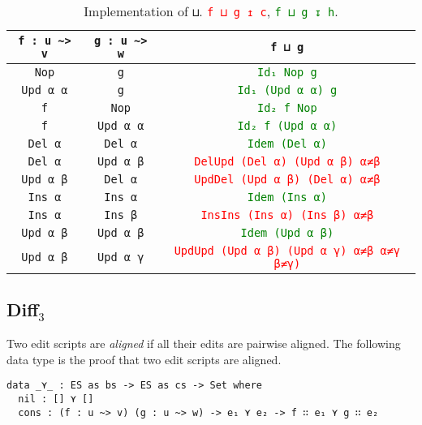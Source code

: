 \documentclass[../Thesis.tex]{subfiles}
\begin{document}
	\begin{table}[h]
	\centering
	\begin{tabular}{| c | c | c |}
	\hline
	\texttt{f : u \textasciitilde> v} & \texttt{g : u \textasciitilde> w} &  \texttt{f ⊔ g} 
	\\ \hline
	\texttt{Nop} & \texttt{g} & \textcolor{Green}{\texttt{Id₁ Nop g}} 
	\\ \hline
	\texttt{Upd α α} & \texttt{g} & \textcolor{Green}{\texttt{Id₁ (Upd α α) g}} 
	\\ \hline
	\texttt{f} & \texttt{Nop} & \textcolor{Green}{\texttt{Id₂ f Nop}} 
	\\ \hline
	\texttt{f} & \texttt{Upd α α} & \textcolor{Green}{\texttt{Id₂ f (Upd α α)}} 
	\\ \hline
	\texttt{Del α} & \texttt{Del α} & \textcolor{Green}{\texttt{Idem (Del α)}}
	\\ \hline
	\texttt{Del α} & \texttt{Upd α β} & \textcolor{Red}{\texttt{DelUpd (Del α) (Upd α β) α≠β}}
	\\ \hline
	\texttt{Upd α β} & \texttt{Del α} & \textcolor{Red}{\texttt{UpdDel (Upd α β) (Del α) α≠β}}
	\\ \hline
	\texttt{Ins α} & \texttt{Ins α} & \textcolor{Green}{\texttt{Idem (Ins α)}} 
	\\	\hline
	\texttt{Ins α} & \texttt{Ins β} & \textcolor{Red}{\texttt{InsIns (Ins α) (Ins β) α≠β}}
	\\	\hline
	\texttt{Upd α β} & \texttt{Upd α β} & \textcolor{Green}{\texttt{Idem (Upd α β)}}
	\\	\hline
	\texttt{Upd α β} & \texttt{Upd α γ} & \textcolor{Red}{\texttt{UpdUpd (Upd α β) (Upd α γ) α≠β α≠γ β≠γ)}}
	\\ \hline
	\end{tabular}
	\caption{Implementation of \texttt{⊔}. \textcolor{Red}{\texttt{f ⊔ g ↥ c}}, \textcolor{Green}{\texttt{f ⊔ g ↧ h}}.}
	\label{table:merge}
	\end{table}		

	\subsection{Diff$_3$}
	Two edit scripts are \emph{aligned} if all their edits are pairwise aligned.	
	The following data type is the proof that two edit scripts are aligned.	
\begin{verbatim}
data _⋎_ : ES as bs -> ES as cs -> Set where
  nil : [] ⋎ []
  cons : (f : u ~> v) (g : u ~> w) -> e₁ ⋎ e₂ -> f ∷ e₁ ⋎ g ∷ e₂ 
\end{verbatim}
\end{document}
